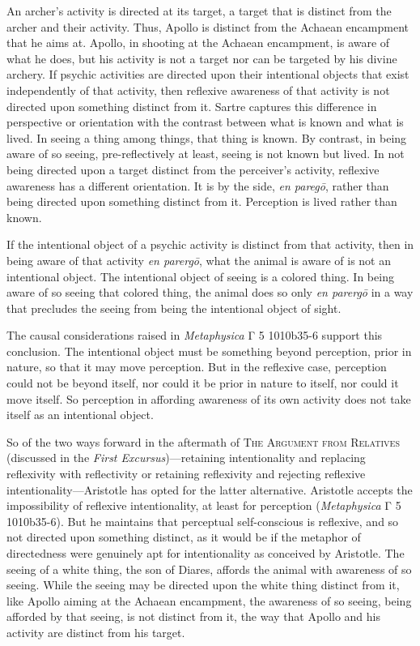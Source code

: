 An archer's activity is directed at its target, a target that is distinct from the archer and their activity. Thus, Apollo is distinct from the Achaean encampment that he aims at. Apollo, in shooting at the Achaean encampment, is aware of what he does, but his activity is not a target nor can be targeted by his divine archery. If psychic activities are directed upon their intentional objects that exist independently of that activity, then reflexive awareness of that activity is not directed upon something distinct from it. Sartre captures this difference in perspective or orientation with the contrast between what is known and what is lived. In seeing a thing among things, that thing is known. By contrast, in being aware of so seeing, pre-reflectively at least, seeing is not known but lived. In not being directed upon a target distinct from the perceiver's activity, reflexive awareness has a different orientation. It is by the side, \emph{en paregō}, rather than being directed upon something distinct from it. Perception is lived rather than known.

If the intentional object of a psychic activity is distinct from that activity, then in being aware of that activity \emph{en parergō}, what the animal is aware of is not an intentional object. The intentional object of seeing is a colored thing. In being aware of so seeing that colored thing, the animal does so only \emph{en parergō} in a way that precludes the seeing from being the intentional object of sight.

The causal considerations raised in \emph{Metaphysica} {\sbl Γ} 5 1010b35-6 support this conclusion. The intentional object must be something beyond perception, prior in nature, so that it may move perception. But in the reflexive case, perception could not be beyond itself, nor could it be prior in nature to itself, nor could it move itself. So perception in affording awareness of its own activity does not take itself as an intentional object.

So of the two ways forward in the aftermath of \textsc{The Argument from Relatives} (discussed in the \emph{First Excursus})—retaining intentionality and replacing reflexivity with reflectivity or retaining reflexivity and rejecting reflexive intentionality—Aristotle has opted for the latter alternative. Aristotle accepts the impossibility of reflexive intentionality, at least for perception (\emph{Metaphysica} {\sbl Γ} 5 1010b35-6). But he maintains that perceptual self-conscious is reflexive, and so not directed upon something distinct, as it would be if the metaphor of directedness were genuinely apt for intentionality as conceived by Aristotle. The seeing of a white thing, the son of Diares, affords the animal with awareness of so seeing. While the seeing may be directed upon the white thing distinct from it, like Apollo aiming at the Achaean encampment, the awareness of so seeing, being afforded by that seeing, is not distinct from it, the way that Apollo and his activity are distinct from his target.

